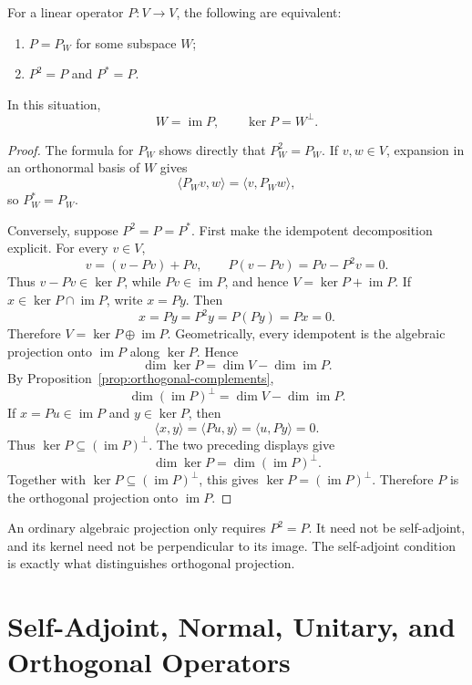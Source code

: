 \begin{proposition}
For a linear operator \(P:V\to V\), the following are equivalent:
\begin{enumerate}
\item \(P=P_W\) for some subspace \(W\);
\item \(P^2=P\) and \(P^*=P\).
\end{enumerate}
In this situation,
\[
W=\operatorname{im}P,
\qquad
\ker P=W^\perp.
\]
\end{proposition}
\begin{proof}
The formula for \(P_W\) shows directly that \(P_W^2=P_W\). If
\(v,w\in V\), expansion in an orthonormal basis of \(W\) gives
\[
\langle P_Wv,w\rangle=\langle v,P_Ww\rangle,
\]
so \(P_W^*=P_W\).

Conversely, suppose \(P^2=P=P^*\). First make the idempotent decomposition
explicit. For every \(v\in V\),
\[
v=(v-Pv)+Pv,\qquad P(v-Pv)=Pv-P^2v=0.
\]
Thus \(v-Pv\in\ker P\), while \(Pv\in\operatorname{im}P\), and hence
\(V=\ker P+\operatorname{im}P\). If
\(x\in\ker P\cap\operatorname{im}P\), write \(x=Py\). Then
\[
x=Py=P^2y=P(Py)=Px=0.
\]
Therefore \(V=\ker P\oplus\operatorname{im}P\). Geometrically, every
idempotent is the algebraic projection onto \(\operatorname{im}P\) along
\(\ker P\).
Hence
\[
\dim\ker P=\dim V-\dim\operatorname{im}P.
\]
By Proposition~\ref{prop:orthogonal-complements},
\[
\dim(\operatorname{im}P)^\perp=\dim V-\dim\operatorname{im}P.
\]
If \(x=Pu\in\operatorname{im}P\) and \(y\in\ker P\), then
\[
\langle x,y\rangle=\langle Pu,y\rangle
=\langle u,Py\rangle=0.
\]
\noindent Thus \(\ker P\subseteq(\operatorname{im}P)^\perp\). The two preceding
displays give
\[
\dim\ker P=\dim(\operatorname{im}P)^\perp.
\]
Together with \(\ker P\subseteq(\operatorname{im}P)^\perp\), this gives
\(\ker P=(\operatorname{im}P)^\perp\). Therefore \(P\) is the orthogonal
projection onto \(\operatorname{im}P\).
\end{proof}

An ordinary algebraic projection only requires \(P^2=P\). It need not be
self-adjoint, and its kernel need not be perpendicular to its image. The
self-adjoint condition is exactly what distinguishes orthogonal projection.

\section{Self-Adjoint, Normal, Unitary, and Orthogonal Operators}

